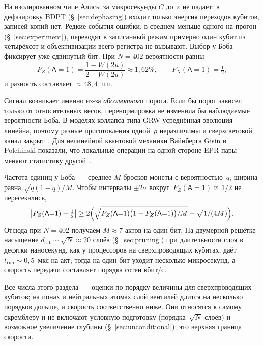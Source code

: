\documentclass[11pt,a4paper]{article}
\newcommand{\qA}{\mathsf{A}}
\begin{document}
На изолированном чипе Алисы за микросекунды $C$ до~$\varepsilon$ не падает: в дефазировку BDPT (\hyperref[sec:dephasing]{\S~\ref*{sec:dephasing}}) входит только энергия переходов кубитов, записей-копий нет. Редкие события ошибки, в среднем меньше одного на прогон (\hyperref[sec:experiment]{\S~\ref*{sec:experiment}}), переводят в записанный режим примерно один кубит из четырёхсот и объективизации всего регистра не вызывают. Выбор у Боба фиксирует уже сдвинутый бит. При $N=402$ вероятности равны
\begin{equation}
P_Z(\qA{=}1)=\frac{1-W(2u)}{2-W(2u)}\approx1{,}62\%,
\qquad
P_X(\qA{=}1)=\tfrac12,
\end{equation}
и разность составляет $\approx48{,}4$~п.п.

Сигнал возникает именно из-за \emph{абсолютного} порога. Если бы порог зависел только от относительных весов, перенормировка не изменила бы наблюдаемые вероятности Боба. В моделях коллапса типа GRW усреднённая эволюция линейна, поэтому разные приготовления одной~$\rho$ неразличимы и сверхсветовой канал закрыт~\cite{ghirardi1986,ghirardi1990,bassi2013}. Для нелинейной квантовой механики Вайнберга Gisin и Polchinski показали, что локальные операции на одной стороне EPR-пары меняют статистику другой~\cite{weinberg1989,gisin1990,polchinski1991}.

Частота единиц у Боба~--- среднее $M$ бросков монеты с вероятностью~$q$; ширина равна $\sqrt{q(1-q)/M}$. Чтобы интервалы $\pm 2\sigma$ вокруг~$P_Z(\qA{=}1)$ и~$1/2$ не пересекались,
\begin{equation}
\bigl|P_Z(\qA{=}1)-\tfrac12\bigr|
\ge
2\Bigl(\sqrt{P_Z(\qA{=}1)\bigl(1-P_Z(\qA{=}1)\bigr)/M}+\sqrt{1/(4M)}\Bigr).
\end{equation}
Отсюда при $N=402$ получаем $M\approx7$ актов на один бит. На двумерной решётке насыщение $d_{\mathrm{sat}}\sim\sqrt{N}\approx20$ слоёв (\hyperref[sec:pruning]{\S~\ref*{sec:pruning}}) при длительности слоя в десятки наносекунд, как у процессоров на сверхпроводящих кубитах, даёт $t_{\mathrm{run}}\sim0{,}5$~мкс на акт; тогда на один бит уходит несколько микросекунд, а скорость передачи составляет порядка сотен кбит/с.

Все числа этого раздела~--- оценки по порядку величины для сверхпроводящих кубитов; на ионах и нейтральных атомах слой вентилей длится на несколько порядков дольше, и скорость соответственно ниже. Они относятся к самому скремблеру и не включают условную подготовку (порядка~$\sqrt N$ слоёв) и возможное увеличение глубины (\hyperref[sec:unconditional]{\S~\ref*{sec:unconditional}}); это верхняя граница скорости.
\end{document}
